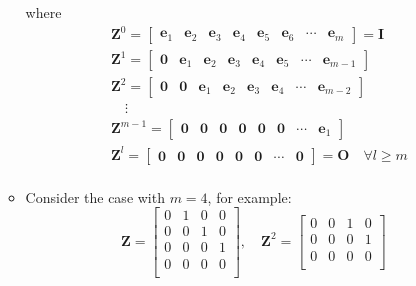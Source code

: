 \documentclass[12pt,a4paper]{article}
\begin{document}
\begin{itemize}
\begin{itemize}
    where
    \begin{equation}\nonumber%
      \begin{aligned}
      &  \bm{Z}^{0} = 
      \begin{bmatrix}
        \bm{e}_{1} & \bm{e}_{2} & \bm{e}_{3} & \bm{e}_{4} & \bm{e}_{5} & \bm{e}_{6} & \cdots & \bm{e}_{m} 
      \end{bmatrix} = \bm{I}\\
      &  \bm{Z}^{1} = 
      \begin{bmatrix}
        \bm{0} & \bm{e}_{1} & \bm{e}_{2} & \bm{e}_{3} & \bm{e}_{4} & \bm{e}_{5} & \cdots & \bm{e}_{m-1} 
      \end{bmatrix}\\
      & \bm{Z}^{2} = 
      \begin{bmatrix}
        \bm{0} & \bm{0} & \bm{e}_{1} & \bm{e}_{2} & \bm{e}_{3} & \bm{e}_{4} & \cdots & \bm{e}_{m-2} 
      \end{bmatrix}\\
      & \quad\vdots \\
      & \bm{Z}^{m-1} = 
      \begin{bmatrix}
        \bm{0} & \bm{0} & \bm{0} & \bm{0} & \bm{0} & \bm{0} & \cdots & \bm{e}_{1} 
      \end{bmatrix}\\
      & \bm{Z}^{l} = 
      \begin{bmatrix}
        \bm{0} & \bm{0} & \bm{0} & \bm{0} & \bm{0} & \bm{0} & \cdots & \bm{0}
      \end{bmatrix} = \bm{O} \quad \forall l\geq m\\
      \end{aligned}
    \end{equation}
  \item Consider the case with $m = 4$, for example:
    \begin{equation}\nonumber%
      \bm{Z} =
      \begin{bmatrix}
        0 & 1 & 0 & 0 \\
        0 & 0 & 1 & 0 \\
        0 & 0 & 0 & 1 \\
        0 & 0 & 0 & 0 \\
      \end{bmatrix},
      \quad
      \bm{Z}^{2} =
      \begin{bmatrix}
        0 & 0 & 1 & 0 \\
        0 & 0 & 0 & 1 \\
        0 & 0 & 0 & 0 \\

\end{bmatrix}
\end{equation}
\end{itemize}
\end{itemize}
\end{document}
